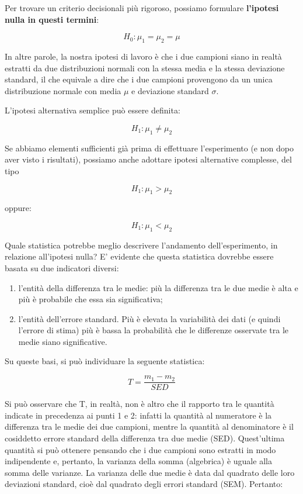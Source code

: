 \documentclass[a4paper,12pt,oneside]{book}
\providecommand{\tightlist}{%
  \setlength{\itemsep}{0pt}\setlength{\parskip}{0pt}}
\theoremstyle{definition}
\theoremstyle{definition}
\theoremstyle{definition}
\theoremstyle{remark}
\begin{document}
Per trovare un criterio decisionali più rigoroso, possiamo formulare
\textbf{l'ipotesi nulla in questi termini}:

\[H_0: \mu_1 = \mu_2 = \mu\]

In altre parole, la nostra ipotesi di lavoro è che i due campioni siano
in realtà estratti da due distribuzioni normali con la stessa media e la
stessa deviazione standard, il che equivale a dire che i due campioni
provengono da un unica distribuzione normale con media \(\mu\) e
deviazione standard \(\sigma\).

L'ipotesi alternativa semplice può essere definita:

\[H_1 :\mu_1  \ne \mu_2\]

Se abbiamo elementi sufficienti già prima di effettuare l'esperimento (e
non dopo aver visto i risultati), possiamo anche adottare ipotesi
alternative complesse, del tipo

\[H_1 :\mu _1  > \mu _2\]

oppure:

\[H_1 :\mu _1  < \mu _2\]

Quale statistica potrebbe meglio descrivere l'andamento
dell'esperimento, in relazione all'ipotesi nulla? E' evidente che questa
statistica dovrebbe essere basata su due indicatori diversi:

\begin{enumerate}
\def\labelenumi{\arabic{enumi}.}
\tightlist
\item
  l'entità della differenza tra le medie: più la differenza tra le due
  medie è alta e più è probabile che essa sia significativa;
\item
  l'entità dell'errore standard. Più è elevata la variabilità dei dati
  (e quindi l'errore di stima) più è bassa la probabilità che le
  differenze osservate tra le medie siano significative.
\end{enumerate}

Su queste basi, si può individuare la seguente statistica:

\[T = \frac{m_1 - m_2}{SED}\]

Si può osservare che T, in realtà, non è altro che il rapporto tra le
quantità indicate in precedenza ai punti 1 e 2: infatti la quantità al
numeratore è la differenza tra le medie dei due campioni, mentre la
quantità al denominatore è il cosiddetto errore standard della
differenza tra due medie (SED). Quest'ultima quantità si può ottenere
pensando che i due campioni sono estratti in modo indipendente e,
pertanto, la varianza della somma (algebrica) è uguale alla somma delle
varianze. La varianza delle due medie è data dal quadrato delle loro
deviazioni standard, cioè dal quadrato degli errori standard (SEM).
Pertanto:
\end{document}
